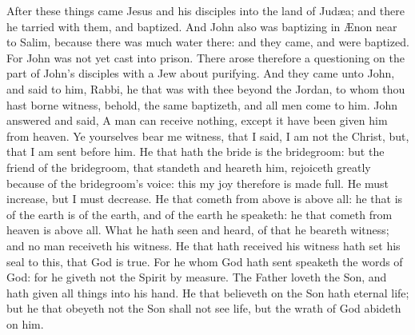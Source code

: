After these things came Jesus and his disciples into the land of Judæa; and there he tarried with them, and baptized. And John also was baptizing in Ænon near to Salim, because there was much water there: and they came, and were baptized. For John was not yet cast into prison. There arose therefore a questioning on the part of John’s disciples with a Jew about purifying. And they came unto John, and said to him, Rabbi, he that was with thee beyond the Jordan, to whom thou hast borne witness, behold, the same baptizeth, and all men come to him. John answered and said, A man can receive nothing, except it have been given him from heaven. Ye yourselves bear me witness, that I said, I am not the Christ, but, that I am sent before him. He that hath the bride is the bridegroom: but the friend of the bridegroom, that standeth and heareth him, rejoiceth greatly because of the bridegroom’s voice: this my joy therefore is made full. He must increase, but I must decrease.  He that cometh from above is above all: he that is of the earth is of the earth, and of the earth he speaketh: he that cometh from heaven is above all. What he hath seen and heard, of that he beareth witness; and no man receiveth his witness. He that hath received his witness hath set his seal to this, that God is true. For he whom God hath sent speaketh the words of God: for he giveth not the Spirit by measure. The Father loveth the Son, and hath given all things into his hand. He that believeth on the Son hath eternal life; but he that obeyeth not the Son shall not see life, but the wrath of God abideth on him. 

